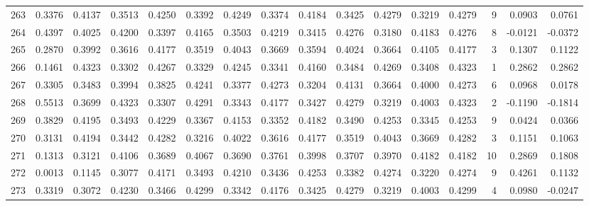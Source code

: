 \begin{tabular}{lrrrrrrrrrrrrrrr}
263 &      0.3376 &  0.4137 &  0.3513 &  0.4250 &  0.3392 &  0.4249 &  0.3374 &  0.4184 &  0.3425 &  0.4279 &   0.3219 &     0.4279 &      9 &                    0.0903 &                     0.0761 \\
264 &      0.4397 &  0.4025 &  0.4200 &  0.3397 &  0.4165 &  0.3503 &  0.4219 &  0.3415 &  0.4276 &  0.3180 &   0.4183 &     0.4276 &      8 &                   -0.0121 &                    -0.0372 \\
265 &      0.2870 &  0.3992 &  0.3616 &  0.4177 &  0.3519 &  0.4043 &  0.3669 &  0.3594 &  0.4024 &  0.3664 &   0.4105 &     0.4177 &      3 &                    0.1307 &                     0.1122 \\
266 &      0.1461 &  0.4323 &  0.3302 &  0.4267 &  0.3329 &  0.4245 &  0.3341 &  0.4160 &  0.3484 &  0.4269 &   0.3408 &     0.4323 &      1 &                    0.2862 &                     0.2862 \\
267 &      0.3305 &  0.3483 &  0.3994 &  0.3825 &  0.4241 &  0.3377 &  0.4273 &  0.3204 &  0.4131 &  0.3664 &   0.4000 &     0.4273 &      6 &                    0.0968 &                     0.0178 \\
268 &      0.5513 &  0.3699 &  0.4323 &  0.3307 &  0.4291 &  0.3343 &  0.4177 &  0.3427 &  0.4279 &  0.3219 &   0.4003 &     0.4323 &      2 &                   -0.1190 &                    -0.1814 \\
269 &      0.3829 &  0.4195 &  0.3493 &  0.4229 &  0.3367 &  0.4153 &  0.3352 &  0.4182 &  0.3490 &  0.4253 &   0.3345 &     0.4253 &      9 &                    0.0424 &                     0.0366 \\
270 &      0.3131 &  0.4194 &  0.3442 &  0.4282 &  0.3216 &  0.4022 &  0.3616 &  0.4177 &  0.3519 &  0.4043 &   0.3669 &     0.4282 &      3 &                    0.1151 &                     0.1063 \\
271 &      0.1313 &  0.3121 &  0.4106 &  0.3689 &  0.4067 &  0.3690 &  0.3761 &  0.3998 &  0.3707 &  0.3970 &   0.4182 &     0.4182 &     10 &                    0.2869 &                     0.1808 \\
272 &      0.0013 &  0.1145 &  0.3077 &  0.4171 &  0.3493 &  0.4210 &  0.3436 &  0.4253 &  0.3382 &  0.4274 &   0.3220 &     0.4274 &      9 &                    0.4261 &                     0.1132 \\
273 &      0.3319 &  0.3072 &  0.4230 &  0.3466 &  0.4299 &  0.3342 &  0.4176 &  0.3425 &  0.4279 &  0.3219 &   0.4003 &     0.4299 &      4 &                    0.0980 &                    -0.0247 \\

\end{tabular}
